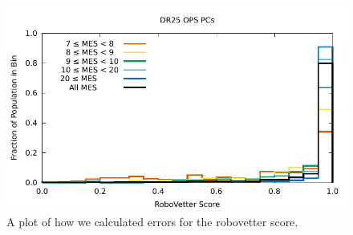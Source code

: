 \begin{figure}
\centering
\includegraphics[width=\linewidth]{Scores-1.pdf}
\caption{A plot of how we calculated errors for the robovetter score.}
\label{score-fig-2}
\end{figure}

